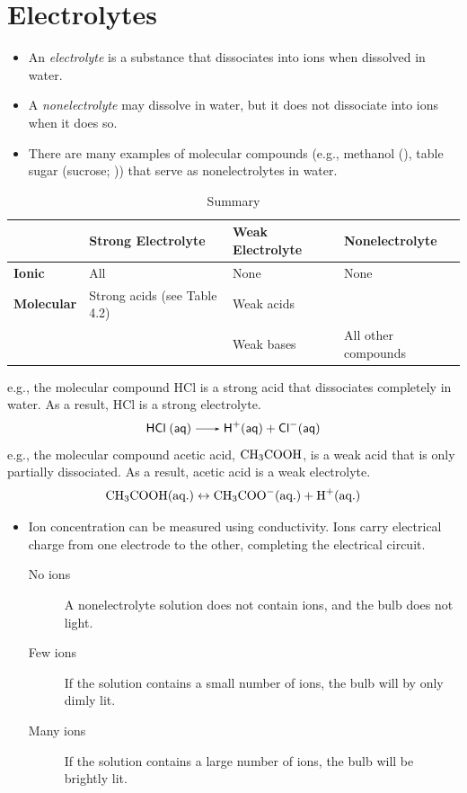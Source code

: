 \documentclass[
	chapter=4
]{chem122notes}
\begin{document}
\section{Electrolytes}\label{sec:electrolytes}
\begin{itemize}
	\item An \emph{electrolyte} is a substance that dissociates into ions when dissolved in water.
	\item A \emph{nonelectrolyte} may dissolve in water, but it does not dissociate into ions when it does so.
	\item There are many examples of molecular compounds (e.g., methanol (), table sugar (sucrose; )) that serve as nonelectrolytes in water.
\end{itemize}

\begin{table}[H]
	\centering
	\caption{Summary}
	\label{tab:electrolyte-bonds}
	\begin{tabular}{l l l l}
		& \textbf{Strong Electrolyte} & \textbf{Weak Electrolyte} & \textbf{Nonelectrolyte}\\
		\hline
		\textbf{Ionic} & All & None & None\\
		\textbf{Molecular} & Strong acids (see Table 4.2) & Weak acids & \\
		& & Weak bases & All other compounds\\
		\hline
	\end{tabular}
\end{table}
e.g., the molecular compound HCl is a strong acid that dissociates completely in water.
As a result, HCl is a strong electrolyte.
\[ \ce{HCl (aq) -> H+(aq) + Cl-(aq)} \]
e.g., the molecular compound acetic acid, $\element{C}\element{H}[3]\element{C}\element{O}\element{O}\element{H}$, is a weak acid that is only partially dissociated.
As a result, acetic acid is a weak electrolyte.
\[ \element{C}\element{H}[3]\element{C}\element{O}\element{O}\element{H} (\mbox{aq.}) \leftrightarrow \element{C}\element{H}[3]\element{C}\element{O}\element{O}^{-} (\mbox{aq.}) + \element{H}^{+} (\mbox{aq.}) \]

\begin{itemize}
	\item Ion concentration can be measured using conductivity.
	Ions carry electrical charge from one electrode to the other, completing the electrical circuit.
	\begin{description}
		\item[No ions] A nonelectrolyte solution does not contain ions, and the bulb does not light.
		\item[Few ions] If the solution contains a small number of ions, the bulb will by only dimly lit.
		\item[Many ions] If the solution contains a large number of ions, the bulb will be brightly lit.
	\end{description}
\end{itemize}
\end{document}
